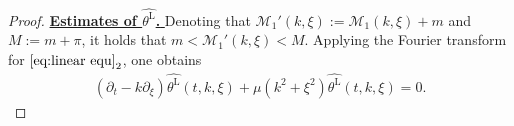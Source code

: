 \documentclass[reqno, 12pt]{amsart} %
\theoremstyle{plain} %
\theoremstyle{definition}
\theoremstyle{remark}
\numberwithin{equation}{section} %
\newcommand{\pt}{\partial_t}
\newcommand{\pxi}{\partial_\xi}
\begin{document}
	\begin{proof}
		\underline{\bf Estimates of $\widehat{\theta^{\mathrm{L}}}$. }
		Denoting that $ \mathcal{M}_1' (k, \xi):= {\mathcal{M}_1} (k, \xi) + m$ and $M:= m+\pi$, it holds that $m<\mathcal{M}_1' (k, \xi)<M$. Applying the Fourier transform for $\eqref{eq:linear equ}_2$, one obtains 
		\begin{align} \label{eq:linear Fourier}
			(\pt- k\pxi) \widehat{\theta^{\mathrm{L}} }(t, k, \xi)  + \mu(k^2 + \xi^2) \widehat{\theta^{\mathrm{L}} }(t, k, \xi)   = 0.
		\end{align}

\end{proof}
\end{document}
